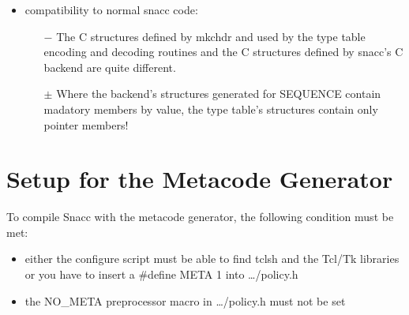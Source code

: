 \begin{itemize}
  \item compatibility to normal snacc code:
  \begin{itemize}
    \item[$-$] The C structures defined by mkchdr and used by the type table encoding and decoding routines and the C structures defined by snacc's C backend are quite different.
    \item[$\pm$] Where the backend's structures generated for SEQUENCE contain madatory members by value, the type table's structures contain only pointer members!
  \end{itemize}

\end{itemize}

\section{\label{metacode-setup}Setup for the Metacode Generator}

To compile Snacc with the metacode generator, the following condition must be met:
\begin{itemize}
  \item either the configure script must be able to find {\ufn tclsh} and the Tcl/Tk libraries or you have to insert a {\C \#define META 1} into {\ufn \dots/policy.h}
  \item the {\C NO\_META} preprocessor macro in {\ufn \dots/policy.h} must not be set
\end{itemize}
